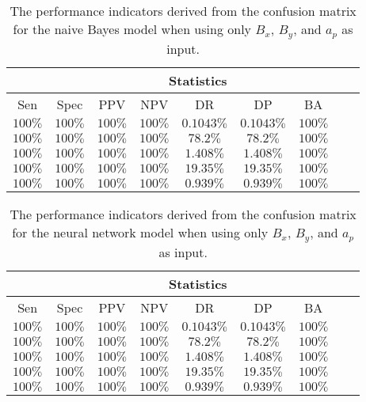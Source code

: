 \begin{table}[!ht]
	\centering
	\begin{tabular}{|c|c|c|c|c|c|c|c|c|}
		\hline
		 & \multicolumn{7}{c|}{Statistics} \\ \hline
		Sen & Spec & PPV & NPV & DR & DP & BA \\ \hline
		$100\%$ & $100\%$ & $100\%$ & $100\%$ & $0.1043\%$ & $0.1043\%$ & $100\%$ \\ \hline
		$100\%$ & $100\%$ & $100\%$ & $100\%$ & $78.2\%$ & $78.2\%$ & $100\%$ \\ \hline
		$100\%$ & $100\%$ & $100\%$ & $100\%$ & $1.408\%$ & $1.408\%$ & $100\%$ \\ \hline
		$100\%$ & $100\%$ & $100\%$ & $100\%$ & $19.35\%$ & $19.35\%$ & $100\%$ \\ \hline
		$100\%$ & $100\%$ & $100\%$ & $100\%$ & $0.939\%$ & $0.939\%$ & $100\%$ \\ \hline
	\end{tabular}
	\caption{The performance indicators derived from the confusion matrix for the naive Bayes model when using only $B_{x}$, $B_{y}$, and $a_{p}$ as input.}
	\label{tab:cs:xyap:nb}
\end{table}

\begin{table}[!ht]
	\centering
	\begin{tabular}{|c|c|c|c|c|c|c|c|c|}
		\hline
		 & \multicolumn{7}{c|}{Statistics} \\ \hline
		Sen & Spec & PPV & NPV & DR & DP & BA \\ \hline
		$100\%$ & $100\%$ & $100\%$ & $100\%$ & $0.1043\%$ & $0.1043\%$ & $100\%$ \\ \hline
		$100\%$ & $100\%$ & $100\%$ & $100\%$ & $78.2\%$ & $78.2\%$ & $100\%$ \\ \hline
		$100\%$ & $100\%$ & $100\%$ & $100\%$ & $1.408\%$ & $1.408\%$ & $100\%$ \\ \hline
		$100\%$ & $100\%$ & $100\%$ & $100\%$ & $19.35\%$ & $19.35\%$ & $100\%$ \\ \hline
		$100\%$ & $100\%$ & $100\%$ & $100\%$ & $0.939\%$ & $0.939\%$ & $100\%$ \\ \hline
	\end{tabular}
	\caption{The performance indicators derived from the confusion matrix for the neural network model when using only $B_{x}$, $B_{y}$, and $a_{p}$ as input.}
	\label{tab:cs:xyap:nnet}
\end{table}

